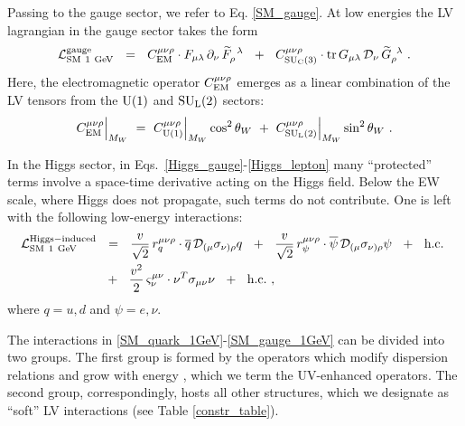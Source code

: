 \documentclass[12pt,preprintnumbers,nofootinbib]{revtex4}
\newcommand{\wt}{\widetilde}
\newcommand{\ov}{\overline}
\newcommand{\md}{\mathcal{D}}
\newcommand{\suc}{{{\rm SU}_{\rm C}(3)}}
\newcommand{\sul}{{{\rm SU}_{\rm L}(2)}}
\newcommand{\ue}{{{\rm U}(1)}}
\newcommand{\el}{{\rm EM}}
\begin{document}
	Passing to the gauge sector, we refer to Eq. \eqref{SM_gauge}.
	At low energies the LV lagrangian in the gauge sector
	takes the form
\begin{equation}
\label{SM_gauge_1GeV}
	\mathcal{L}_{\rm SM\ 1~GeV}^{\rm gauge} ~~=~~
	C^{\mu\nu\rho}_\el \cdot 
	F_{\mu\lambda}\, \partial_\nu\, \wt{F}_\rho^{\phantom{\rho}\lambda}
	~~+~~
	C_{\suc}^{\mu\nu\rho} \cdot 
	{\rm tr}\,
	G_{\mu\lambda}\, \mathcal{D}_\nu\, \wt{G}_\rho^{\phantom{\rho}\lambda}
	~.
\end{equation}
	Here, the electromagnetic operator
$ C^{\mu\nu\rho}_\el $
	emerges as a linear combination of the LV
	tensors from the $ \ue $ and $ \sul $ sectors:
\[
	C^{\mu\nu\rho}_\el\Bigr|_{M_W} ~=~ 
		C^{\mu\nu\rho}_{\ue}\Bigr|_{M_W} \cos^2 \theta_W ~+~ 
		C^{\mu\nu\rho}_{\sul}\Bigr|_{M_W} \sin^2 \theta_W~.
\]


	In the Higgs sector, in Eqs.~\eqref{Higgs_gauge}-\eqref{Higgs_lepton} many
	``protected'' terms involve a space-time derivative acting on the Higgs field.
	Below the EW scale, where Higgs does not propagate, such terms do not contribute.
	One is left with the following low-energy interactions:
\begin{align}
\notag
	\mathcal{L}_{\rm SM\ 1~GeV}^{\rm Higgs-induced} & ~~=~~
	\frac{v}{\sqrt{2}}\,r_{q}^{\mu\nu\rho} \cdot \ov{q}\, \md_{(\mu} \sigma_{\nu)\rho} q   ~~+~~
	\frac{v}{\sqrt{2}}\,r_{\psi}^{\mu\nu\rho} \cdot \ov{\psi}\, \md_{(\mu} \sigma_{\nu)\rho} \psi 
	~~+~~
	\text{h.c.}~
	\\
	& 
\label{SM_Higgs_1GeV}
	~~+~~
	\frac{v^2}{2}\,\varsigma_\nu^{\mu\nu} \cdot \nu^T \sigma_{\mu\nu} \nu
	~~+~~
	\text{h.c.}~,
\end{align}
	where $ q = u, d $ and $ \psi = e, \nu $.

	The interactions in \eqref{SM_quark_1GeV}-\eqref{SM_gauge_1GeV} 
	can be divided into two groups.
	The first group is formed by the operators which modify dispersion relations
	and grow with energy \cite{MP:}, which we term the UV-enhanced operators.
	The second group, correspondingly, hosts all other
	structures, which we designate as ``soft'' LV interactions  
	(see Table \ref{constr_table}).
\end{document}
